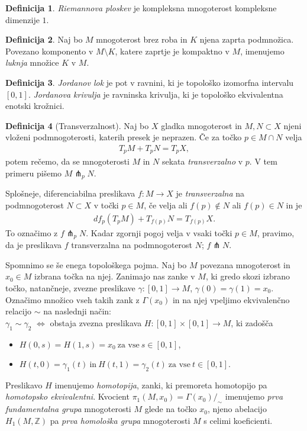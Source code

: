 \documentclass[12pt,a4paper,twoside]{article}
\theoremstyle{definition} %
\newtheorem{definicija}{Definicija}[section]
\theoremstyle{plain} %
\numberwithin{equation}{section}  %
\begin{document}
\begin{definicija}
\emph{Riemannova ploskev} je kompleksna mnogoterost kompleksne dimenzije $1$.
\end{definicija}

\begin{definicija}
Naj bo $M$ mnogoterost brez roba in $K$ njena zaprta podmnožica. Povezano komponento v $M \setminus K$, katere zaprtje je kompaktno v $M$, imenujemo \emph{luknja} množice $K$ v $M$.
\end{definicija}

\begin{definicija}
\emph{Jordanov lok} je pot v ravnini, ki je topološko izomorfna intervalu $[0,1]$.
\emph{Jordanova krivulja} je ravninska krivulja, ki je topološko ekvivalentna enotski krožnici.
\end{definicija}

\begin{definicija} [Transverzalnost]
Naj bo $X$ gladka mnogoterost in $M, N \subset X$ njeni vloženi podmnogoterosti, katerih presek je neprazen.
Če za točko $p \in M \cap N$ velja
\begin{gather*}
T_{p}M + T_{p}N = T_{p}X,
\end{gather*} 
potem rečemo, da se mnogoterosti $M$ in $N$ sekata \emph{transverzalno} v $p$. V tem primeru pišemo $M \pitchfork_{p} N$.

Splošneje, diferenciabilna preslikava $f \colon M \to X$ je \emph{transverzalna} na podmnogoterost $N \subset X$ v točki $p \in M$, če velja ali $f(p) \notin N$ ali $f(p) \in N$ in je
\begin{gather*}
df_{p}(T_{p}M) + T_{f(p)}N = T_{f(p)}X.
\end{gather*}
To označimo z $f \pitchfork_{p} N$. Kadar zgornji pogoj velja v vsaki točki $p \in M$, pravimo, da je preslikava $f$ transverzalna na podmnogoterost $N$; $f \pitchfork N$.
\end{definicija}

Spomnimo se še enega topološkega pojma. Naj bo $M$ povezana mnogoterost in $x_{0} \in M$ izbrana točka na njej. Zanimajo nas zanke v $M$, ki gredo skozi izbrano točko, natančneje, zvezne preslikave $\gamma \colon [0,1] \to M$, $\gamma(0) = \gamma(1) = x_{0}$. Označimo množico vseh takih zank z $\Gamma(x_{0})$ in na njej vpeljimo ekvivalenčno relacijo $\sim$ na naslednji način:\\[0.3cm]
$\gamma_{1} \sim \gamma_{2}$ $\iff$ obstaja zvezna preslikava $H \colon [0,1] \times [0,1] \to M$, ki zadošča 
\begin{itemize}
\item $H(0,s) = H(1,s) = x_{0} \ \text{za vse} \ s \in [0,1]$, 
\item $H(t,0) = \gamma_{1}(t) \ \text{in} \ H(t,1) = \gamma_{2}(t) \ \text{za vse} \ t \in [0,1]$.
\end{itemize}
Preslikavo $H$ imenujemo \emph{homotopija}, zanki, ki premoreta homotopijo pa \emph{homotopsko ekvivalentni}.
Kvocient $\pi_{1}(M,x_{0}) = \Gamma(x_{0}) / _{\sim}$ imenujemo \emph{prva fundamentalna grupa} mnogoterosti $M$ glede na točko $x_{0}$, njeno abelacijo $H_{1}(M, \mathbb{Z})$ pa \emph{prva homološka grupa} mnogoterosti $M$ s celimi koeficienti.
\end{document}
